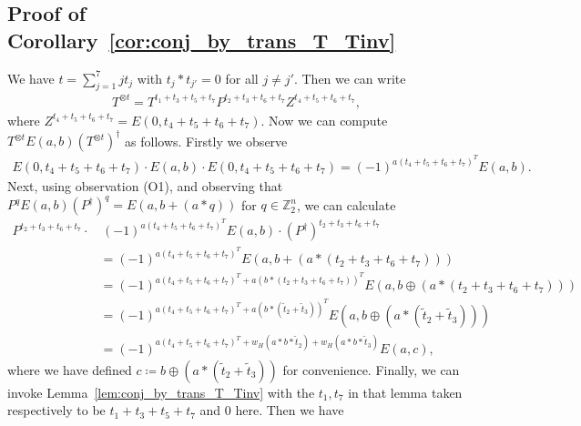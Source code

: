 \documentclass[twoside,romanappendices]{IEEEtran}
\begin{document}
\subsection{Proof of Corollary~\ref{cor:conj_by_trans_T_Tinv}}
\label{sec:proof_cor_conj_by_trans_T_Tinv}


We have $t = \sum_{j=1}^{7} j t_j$ with $t_j \ast t_{j'} = 0$ for all $j \neq j'$.
Then we can write 
\begin{align*}
T^{\otimes t} = T^{t_1 + t_3 + t_5 + t_7} P^{t_2 + t_3 + t_6 + t_7} Z^{t_4 + t_5 + t_6 + t_7},
\end{align*}
where $Z^{t_4 + t_5 + t_6 + t_7} = E(0, t_4 + t_5 + t_6 + t_7)$.
Now we can compute $T^{\otimes t} E(a,b) (T^{\otimes t})^{\dagger}$ as follows.
Firstly we observe
\begin{align}
E(0, t_4 + t_5 + t_6 + t_7) \cdot E(a,b) \cdot E(0, t_4 + t_5 + t_6 + t_7) = (-1)^{a (t_4 + t_5 + t_6 + t_7)^T} E(a,b).
\end{align}
Next, using observation (O1), and observing that $P^q E(a,b) (P^{\dagger})^q = E(a,b+ (a \ast q))$ for $q \in \mathbb{Z}_2^n$, we can calculate
\begin{align}
P^{t_2 + t_3 + t_6 + t_7} \cdot & \, (-1)^{a (t_4 + t_5 + t_6 + t_7)^T} E(a,b) \cdot (P^{\dagger})^{t_2 + t_3 + t_6 + t_7} \nonumber \\
%
  & = (-1)^{a (t_4 + t_5 + t_6 + t_7)^T} E(a, b + (a \ast (t_2 + t_3 + t_6 + t_7)) ) \\
%
  & = (-1)^{a (t_4 + t_5 + t_6 + t_7)^T + a (b \ast (t_2 + t_3 + t_6 + t_7))^T} E(a, b \oplus (a \ast (t_2 + t_3 + t_6 + t_7)) )  \\
%
  & = (-1)^{a (t_4 + t_5 + t_6 + t_7)^T + a (b \ast (\tilde{t}_2 + \tilde{t}_3))^T} E(a, b \oplus (a \ast (\tilde{t}_2 + \tilde{t}_3)) ) \\
%
  & = (-1)^{a (t_4 + t_5 + t_6 + t_7)^T + w_H(a \ast b \ast \tilde{t}_2) + w_H(a \ast b \ast \tilde{t}_3)} E(a, c ),
\end{align}
where we have defined $c \coloneqq b \oplus (a \ast (\tilde{t}_2 + \tilde{t}_3))$ for convenience.
Finally, we can invoke Lemma~\ref{lem:conj_by_trans_T_Tinv} with the $t_1, t_7$ in that lemma taken respectively to be $t_1 + t_3 + t_5 + t_7$ and $0$ here.
Then we have
\end{document}
